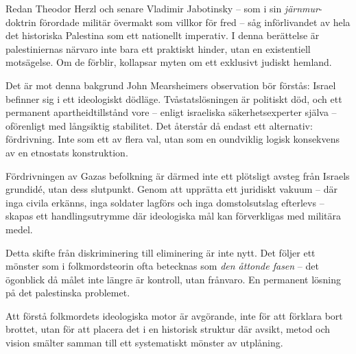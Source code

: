 Redan Theodor Herzl och senare Vladimir Jabotinsky – som i sin \textit{järnmur}-doktrin förordade militär övermakt som villkor för fred – såg införlivandet av hela det historiska Palestina som ett nationellt imperativ. I denna berättelse är palestiniernas närvaro inte bara ett praktiskt hinder, utan en existentiell motsägelse. Om de förblir, kollapsar myten om ett exklusivt judiskt hemland.

Det är mot denna bakgrund John Mearsheimers observation bör förstås: Israel befinner sig i ett ideologiskt dödläge. Tvåstatslösningen är politiskt död, och ett permanent apartheidtillstånd vore – enligt israeliska säkerhetsexperter själva – oförenligt med långsiktig stabilitet. Det återstår då endast ett alternativ: fördrivning. Inte som ett av flera val, utan som en oundviklig logisk konsekvens av en etnostats konstruktion.

Fördrivningen av Gazas befolkning är därmed inte ett plötsligt avsteg från Israels grundidé, utan dess slutpunkt. Genom att upprätta ett juridiskt vakuum – där inga civila erkänns, inga soldater lagförs och inga domstolsutslag efterlevs – skapas ett handlingsutrymme där ideologiska mål kan förverkligas med militära medel.

Detta skifte från diskriminering till eliminering är inte nytt. Det följer ett mönster som i folkmordsteorin ofta betecknas som \textit{den åttonde fasen} – det ögonblick då målet inte längre är kontroll, utan frånvaro. En permanent lösning på det palestinska problemet.

Att förstå folkmordets ideologiska motor är avgörande, inte för att förklara bort brottet, utan för att placera det i en historisk struktur där avsikt, metod och vision smälter samman till ett systematiskt mönster av utplåning.
